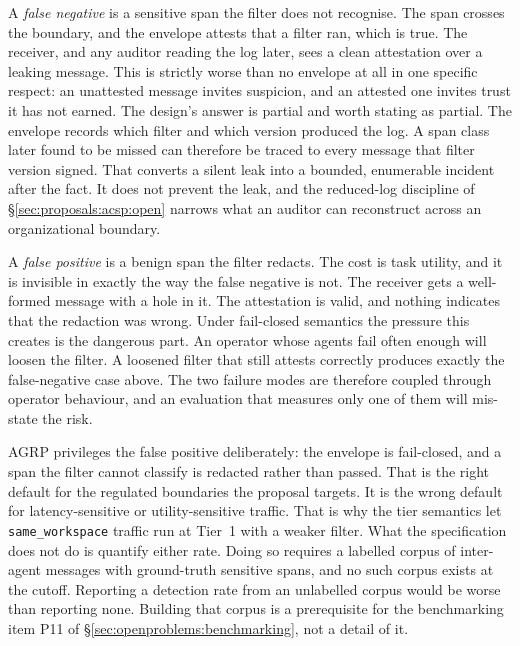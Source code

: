 A \emph{false negative} is a sensitive span the filter does
not recognise. The span crosses the boundary, and the
envelope attests that a filter ran, which is true. The
receiver, and any auditor reading the log later, sees a
clean attestation over a leaking message. This is strictly
worse than no envelope at all in one specific respect: an
unattested message invites suspicion, and an attested one
invites trust it has not earned. The design's answer is
partial and worth stating as partial. The envelope records
which filter and which version produced the log. A span
class later found to be missed can therefore be traced to
every message that filter version signed. That
converts a silent leak into a bounded, enumerable incident
after the fact. It does not prevent the leak, and the
reduced-log discipline of
\S\ref{sec:proposals:acsp:open} narrows what an
auditor can reconstruct across an organizational boundary.

A \emph{false positive} is a benign span the filter redacts.
The cost is task utility, and it is invisible in exactly the
way the false negative is not. The receiver gets a
well-formed message with a hole in it. The attestation is
valid, and nothing indicates that the redaction was wrong.
Under fail-closed semantics the pressure this creates is
the dangerous part. An operator whose agents fail often
enough will loosen the filter. A loosened filter that
still attests correctly produces exactly the false-negative
case above. The two failure modes are therefore coupled
through operator behaviour, and an evaluation that measures
only one of them will mis-state the risk.

AGRP privileges the false positive deliberately: the
envelope is fail-closed, and a span the filter cannot
classify is redacted rather than passed. That is the right
default for the regulated boundaries the proposal targets.
It is the wrong default for latency-sensitive or
utility-sensitive traffic. That is why the tier semantics
let \texttt{same\_workspace} traffic run at Tier~1 with a
weaker filter. What the specification does not do is
quantify either rate. Doing so requires a labelled corpus
of inter-agent messages with ground-truth sensitive spans,
and no such corpus exists at the cutoff. Reporting a
detection rate from an unlabelled corpus would be worse than
reporting none. Building that corpus is a prerequisite for
the benchmarking item P11 of
\S\ref{sec:openproblems:benchmarking}, not a detail of it.

